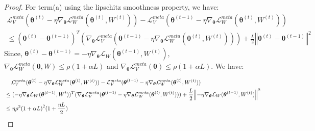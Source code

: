 \begin{proof}
For term(a) using the lipschitz smoothness property, we have:
\begin{equation}
\begin{aligned}
\mathcal{L}_V^{meta}(\boldsymbol{\theta}^{(t)} - \eta\nabla_{\boldsymbol{\theta}}\mathcal{L}_W^{meta}(\boldsymbol{\theta}^{(t)}, W^{(t)})) - \mathcal{L}_V^{meta}(\boldsymbol{\theta}^{(t-1)} - \eta\nabla_{\boldsymbol{\theta}}\mathcal{L}_W^{meta}(\boldsymbol{\theta}^{(t)}, W^{(t)})) \\
\leq (\boldsymbol{\theta}^{(t)} - \boldsymbol{\theta}^{(t-1)})^T(\nabla_{\boldsymbol{\theta}}\mathcal{L}_V^{meta}(\boldsymbol{\theta}^{(t-1)} - \eta\nabla_{\boldsymbol{\theta}}\mathcal{L}_W^{meta}(\boldsymbol{\theta}^{(t)}, W^{(t)}))) + \frac{L}{2}{\left\Vert\boldsymbol{\theta}^{(t)} - \boldsymbol{\theta}^{(t-1)}\right\Vert}^2  
\end{aligned}    
\end{equation}
Since, $\boldsymbol{\theta}^{(t)} - \boldsymbol{\theta}^{(t-1)} = -\eta \nabla_{\boldsymbol{\theta}}\mathcal{L}_W(\boldsymbol{\theta}^{(t-1)}, W^{(t)})$, $\nabla_{\boldsymbol{\theta}}\mathcal{L}_W^{meta}(\boldsymbol{\theta}, W) \leq \rho(1+\alpha L)$ and $\nabla_{\boldsymbol{\theta}} \mathcal{L}_V^{meta}(\boldsymbol{\theta}) \leq \rho(1+\alpha L)$. We have:


\begin{align}
&\hspace{0.4cm}\mathcal{L}_V^{meta}(\boldsymbol{\theta}^{(t)} - \eta\nabla_{\boldsymbol{\theta}}\mathcal{L}_W^{meta}(\boldsymbol{\theta}^{(t)}, W^{(t)})) - \mathcal{L}_V^{meta}(\boldsymbol{\theta}^{(t-1)} - \eta\nabla_{\boldsymbol{\theta}}\mathcal{L}_W^{meta}(\boldsymbol{\theta}^{(t)}, W^{(t)})) \\
&\leq (-\eta \nabla_{\boldsymbol{\theta}}\mathcal{L}_W(\boldsymbol{\theta}^{(t-1)}, W^{t}))^T(\nabla_{\boldsymbol{\theta}}\mathcal{L}_V^{meta}(\boldsymbol{\theta}^{(t-1)} - \eta\nabla_{\boldsymbol{\theta}}\mathcal{L}_W^{meta}(\boldsymbol{\theta}^{(t)}, W^{(t)}))) + \frac{L}{2}{\left\Vert-\eta \nabla_{\boldsymbol{\theta}}\mathcal{L}_W(\boldsymbol{\theta}^{(t-1)}, W^{(t)})\right\Vert}^2 \\ 
&\leq \eta {\rho}^2{(1+\alpha L)}^2 (1 + \frac{\eta L}{2})
\end{align}


\end{proof}
